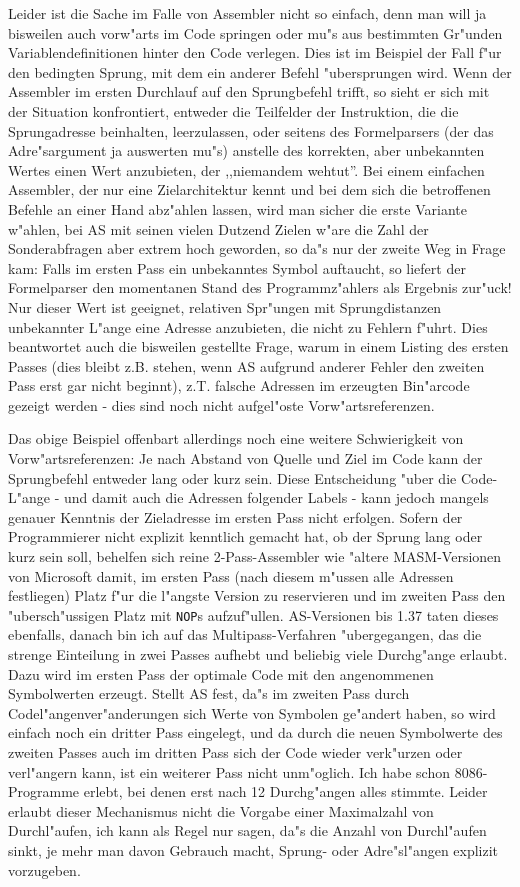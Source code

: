 \documentclass[12pt,a4paper,twoside]{report}
\newcommand{\tty}[1]{{\tt #1}}
\begin{document}
Leider ist die Sache im Falle von Assembler nicht so einfach, denn man
will ja bisweilen auch vorw"arts im Code springen oder mu"s aus bestimmten
Gr"unden Variablendefinitionen hinter den Code verlegen.  Dies ist
im Beispiel der Fall f"ur den bedingten Sprung, mit dem ein anderer
Befehl "ubersprungen wird.  Wenn der Assembler im ersten Durchlauf auf
den Sprungbefehl trifft, so sieht er sich mit der Situation konfrontiert,
entweder die Teilfelder der Instruktion, die die Sprungadresse beinhalten,
leerzulassen, oder seitens des Formelparsers (der das Adre"sargument ja
auswerten mu"s) anstelle des korrekten, aber unbekannten Wertes einen Wert
anzubieten, der ,,niemandem wehtut''.  Bei einem einfachen Assembler, der
nur eine Zielarchitektur kennt und bei dem sich die betroffenen Befehle
an einer Hand abz"ahlen lassen, wird man sicher die erste Variante w"ahlen,
bei AS mit seinen vielen Dutzend Zielen w"are die Zahl der Sonderabfragen
aber extrem hoch geworden, so da"s nur der zweite Weg in Frage kam: Falls
im ersten Pass ein unbekanntes Symbol auftaucht, so liefert der Formelparser
den momentanen Stand des Programmz"ahlers als Ergebnis zur"uck!  Nur dieser
Wert ist geeignet, relativen Spr"ungen mit Sprungdistanzen unbekannter
L"ange eine Adresse anzubieten, die nicht zu Fehlern f"uhrt.  Dies beantwortet
auch die bisweilen gestellte Frage, warum in einem Listing des ersten
Passes (dies bleibt z.B. stehen, wenn AS aufgrund anderer Fehler den
zweiten Pass erst gar nicht beginnt), z.T. falsche Adressen im erzeugten
Bin"arcode gezeigt werden - dies sind noch nicht aufgel"oste
Vorw"artsreferenzen.

Das obige Beispiel offenbart allerdings noch eine weitere Schwierigkeit
von Vorw"artsreferenzen: Je nach Abstand von Quelle und Ziel im Code kann
der Sprungbefehl entweder lang oder kurz sein.  Diese Entscheidung "uber
die Code-L"ange - und damit auch die Adressen folgender Labels - kann
jedoch mangels genauer Kenntnis der Zieladresse im ersten Pass nicht
erfolgen.  Sofern der Programmierer nicht explizit kenntlich gemacht hat,
ob der Sprung lang oder kurz sein soll, behelfen sich reine 2-Pass-Assembler
wie "altere MASM-Versionen von Microsoft damit, im ersten Pass (nach diesem
m"ussen alle Adressen festliegen) Platz f"ur die l"angste Version zu
reservieren und im zweiten Pass den "ubersch"ussigen Platz mit \tty{NOP}s
aufzuf"ullen.  AS-Versionen bis 1.37 taten dieses ebenfalls, danach bin
ich auf das Multipass-Verfahren "ubergegangen, das die strenge Einteilung
in zwei Passes aufhebt und beliebig viele Durchg"ange erlaubt.  Dazu wird
im ersten Pass der optimale Code mit den angenommenen Symbolwerten erzeugt.
Stellt AS fest, da"s im zweiten Pass durch Codel"angenver"anderungen sich
Werte von Symbolen ge"andert haben, so wird einfach noch ein dritter Pass
eingelegt, und da durch die neuen Symbolwerte des zweiten Passes auch
im dritten Pass sich der Code wieder verk"urzen oder verl"angern kann,
ist ein weiterer Pass nicht unm"oglich.  Ich habe schon 8086-Programme
erlebt, bei denen erst nach 12 Durchg"angen alles stimmte.  Leider
erlaubt dieser Mechanismus nicht die Vorgabe einer Maximalzahl von
Durchl"aufen, ich kann als Regel nur sagen, da"s die Anzahl von Durchl"aufen
sinkt, je mehr man davon Gebrauch macht, Sprung- oder Adre"sl"angen explizit
vorzugeben.
\end{document}

